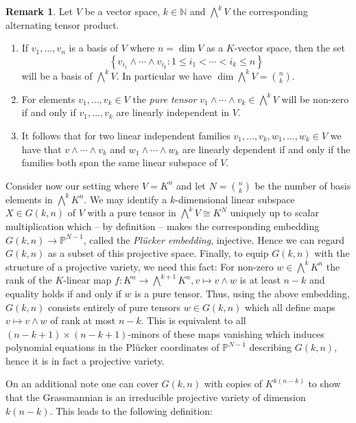 \documentclass[
  paper=a4,
  DIV=14,
  fontsize=12pt,
  titlepage,
  bibliography=totoc,
  listof=totoc,
  pagesize=pdftex
]{scrartcl}
\numberwithin{figure}{section}
\numberwithin{equation}{section}
\numberwithin{table}{section}
\newcommand*\setN{\mathds{N}}
\newcommand*\setP{\mathds{P}}
\theoremstyle{definition}
\newtheorem{remark}[definition]{Remark}
\numberwithin{definition}{section}
\begin{document}
\begin{remark}
  Let $V$ be a vector space, $k \in \setN$ and $\bigwedge^k V$ the corresponding
  alternating tensor product.
  \begin{enumerate}
    \item If $v_1, \dots, v_n$ is a basis of $V$ where $n=\dim V$ as a $K$-vector space,
      then the set
      \[
        \left\{
          v_{i_1} \wedge \cdots \wedge v_{i_k} : 1\leq i_1 < \cdots < i_k \leq n
        \right\}
      \]
      will be a basis of $\bigwedge^kV$. In particular we have $\dim\bigwedge^kV = \binom
      nk$.
    \item For elements $v_1, \dots, v_k \in V$ the \emph{pure tensor} $v_1\wedge \cdots
      \wedge v_k \in \bigwedge^kV$ will be non-zero if and only if $v_1, \dots, v_k$ are
      linearly independent in $V$.
    \item It follows that for two linear independent families $v_1, \dots, v_k, w_1,
      \dots, w_k \in V$ we have that $v\wedge\cdots \wedge v_k$ and $w_1\wedge\cdots\wedge
      w_k$ are linearly dependent if and only if the families both span the same linear
      subspace of $V$.
  \end{enumerate}
\end{remark}

Consider now our setting where $V=K^n$ and let $N = \binom nk$ be the number of basis
elements in $\bigwedge^kK^n$. We may identify a $k$-dimensional linear subspace $X \in
G(k,n)$ of $V$ with a pure tensor in $\bigwedge^kV \cong K^N$ uniquely up to scalar
multiplication which -- by definition -- makes the corresponding embedding $G(k,n) \to
\setP^{N-1}$, called the \emph{Plücker embedding}, injective. Hence we can regard $G(k,n)$
as a subset of this projective space. Finally, to equip $G(k,n)$ with the structure of a
projective variety, we need this fact: For non-zero $w\in \bigwedge^kK^n$ the rank of the
$K$-linear map $f:K^n \to \bigwedge^{k+1}K^n, v \mapsto v \wedge w$ is at least $n-k$ and
equality holds if and only if $w$ is a pure tensor. Thus, using the above embedding,
$G(k,n)$ consists entirely of pure tensors $w\in G(k,n)$ which all define maps $v\mapsto
v\wedge w$ of rank at most $n-k$. This is equivalent to all $(n-k+1) \times
(n-k+1)$-minors of these maps vanishing which induces polynomial equations in the Plücker
coordinates of $\setP^{N-1}$ describing $G(k,n)$, hence it is in fact a projective
variety.

On an additional note one can cover $G(k,n)$ with copies of $K^{k(n-k)}$ to show that the
Grassmannian is an irreducible projective variety of dimension $k(n-k)$. This leads to the
following definition:
\end{document}
